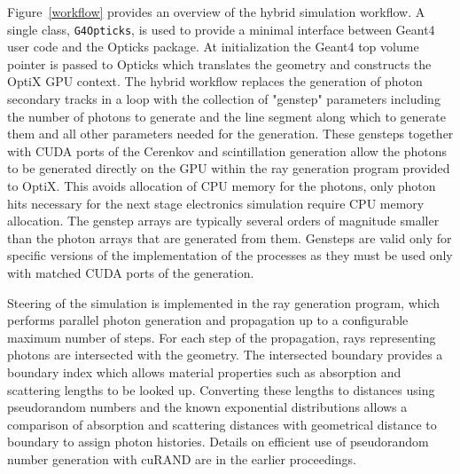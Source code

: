 \documentclass{webofc}
\begin{document}
Figure~\ref{workflow} provides an overview of the hybrid simulation workflow. 
A single class, {\tt G4Opticks}, is used to provide a 
minimal interface between Geant4 user code and 
the Opticks package. 
At initialization the Geant4 top volume pointer is
passed to Opticks which translates the geometry and constructs 
the OptiX GPU context.
%
The hybrid workflow replaces the generation of photon secondary tracks in a loop
with the collection of "genstep" parameters including the number of photons to generate
and the line segment along which to generate them and all other parameters needed for the generation.
These gensteps together with CUDA ports of the Cerenkov and scintillation generation  
allow the photons to be generated directly on the GPU within the ray generation program 
provided to OptiX.
%
This avoids allocation of CPU memory for the photons, only photon hits necessary for 
the next stage electronics simulation require CPU memory allocation.  
%
The genstep arrays are typically several orders of magnitude smaller than the photon arrays 
that are generated from them.  Gensteps are valid only for specific versions of the implementation
of the processes as they must be used only with matched CUDA ports of the generation.  

Steering of the simulation is implemented in the ray generation program, 
which performs parallel photon generation and propagation up to a configurable maximum 
number of steps. For each step of the propagation, rays representing photons are intersected
with the geometry. The intersected boundary provides a boundary index which allows 
material properties such as absorption and scattering lengths to be looked up. 
Converting these lengths to distances using pseudorandom numbers and 
the known exponential distributions allows a comparison of absorption and scattering distances 
with geometrical distance to boundary to assign photon histories. 
Details on efficient use of pseudorandom number generation with cuRAND\cite{curandURL} are in the 
earlier proceedings\cite{chep2016}.
%
%
%
%
\end{document}
